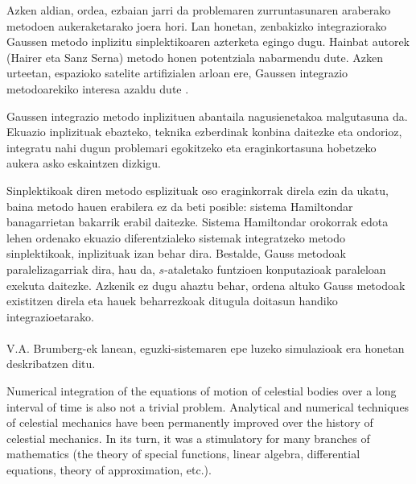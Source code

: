 Azken aldian, ordea, ezbaian jarri da problemaren zurruntasunaren araberako metodoen aukeraketarako joera hori. Lan honetan, zenbakizko integraziorako Gaussen metodo inplizitu sinplektikoaren azterketa egingo dugu. Hainbat autorek (Hairer \cite{Hairer2006,Hairer2008} eta Sanz Serna\cite{JMSanz-Serna1994}) metodo honen potentziala nabarmendu dute. Azken urteetan, espazioko satelite artifizialen arloan ere, Gaussen integrazio metodoarekiko interesa azaldu dute \cite{Bradley2014,Beylkin2014}. 

Gaussen integrazio metodo inplizituen abantaila nagusienetakoa malgutasuna da. Ekuazio inplizituak ebazteko, teknika ezberdinak konbina daitezke eta ondorioz, integratu nahi dugun problemari egokitzeko eta eraginkortasuna hobetzeko aukera asko eskaintzen dizkigu.

Sinplektikoak diren metodo esplizituak oso eraginkorrak direla ezin da ukatu, baina metodo hauen erabilera ez da beti posible: sistema Hamiltondar banagarrietan bakarrik erabil daitezke. Sistema Hamiltondar orokorrak edota lehen ordenako ekuazio diferentzialeko sistemak integratzeko metodo sinplektikoak, inplizituak izan behar dira. Bestalde, Gauss metodoak paralelizagarriak dira, hau da, $s$-ataletako funtzioen konputazioak paraleloan exekuta daitezke. Azkenik ez dugu ahaztu behar, ordena altuko Gauss metodoak existitzen direla  eta hauek beharrezkoak ditugula doitasun handiko integrazioetarako.     


\paragraph*{} V.A. Brumberg-ek \cite[2012]{Brumberg2013} lanean, eguzki-sistemaren epe luzeko simulazioak era honetan deskribatzen ditu.
\begin{displayquote}
Numerical integration of the equations of motion of celestial bodies over a long interval of time is also not a trivial problem. Analytical and numerical techniques of celestial mechanics have been permanently improved over the history of celestial mechanics. In its turn, it was a stimulatory for many branches of mathematics (the theory of special functions, linear algebra, differential equations, theory of approximation, etc.).
\end{displayquote}  

